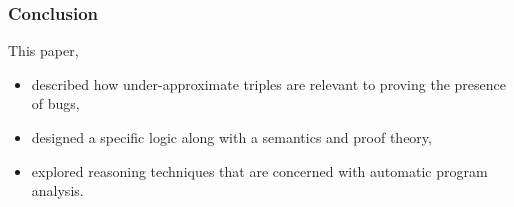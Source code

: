 \documentclass[11pt]{beamer}
\begin{document}





\begin{frame}\frametitle{Conclusion}
This paper,
\begin{itemize}
\item described how  under-approximate triples are relevant to proving the presence of bugs,
\item designed a specific logic along with a semantics and proof theory,
\item explored reasoning techniques that are concerned with automatic program analysis.

\end{itemize}

\end{frame}
\end{document}
